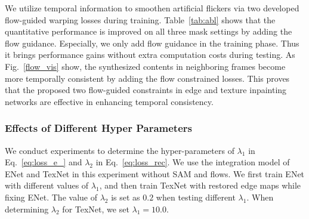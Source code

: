 We utilize temporal information to smoothen artificial flickers via two developed flow-guided warping losses during training. 
Table~\ref{tab:abl} shows that the quantitative performance is improved on all three mask settings by adding the flow guidance. Especially, we only add flow guidance in the training phase. 
Thus it brings performance gains without extra computation costs during testing.
%
As Fig.~\ref{flow_vis} show, the synthesized contents in neighboring frames become more temporally consistent by adding the flow constrained losses.
This proves that the proposed two flow-guided constraints in edge and texture inpainting networks are effective in enhancing temporal consistency.


 


\subsubsection{Effects of Different Hyper Parameters}
We conduct experiments to determine the hyper-parameters of $\lambda_1$ in Eq.~\eqref{eq:loss_e_} and $\lambda_2$ in Eq.~\eqref{eq:loss_rec}. 
We use the integration model of ENet and TexNet in this experiment without SAM and flows.
We first train ENet with different values of $\lambda_1$, and then train TexNet with restored edge maps while fixing ENet. The value of $\lambda_2$ is set as $0.2$ when testing different $\lambda_1$.
When determining $\lambda_2$ for TexNet, we set $\lambda_1=10.0$.

